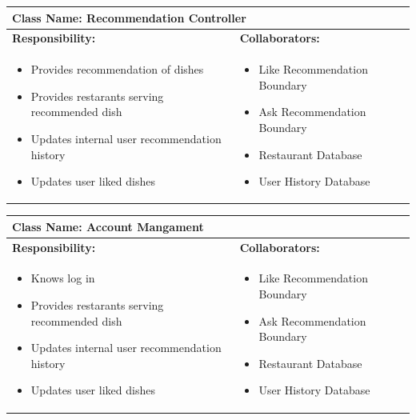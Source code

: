 \documentclass[]{article}
\begin{document}
\begin{table}[H]
	\centering
	\begin{tabular}{|p{7cm}|p{7cm}|}
	\hline 
	 \multicolumn{2}{|l|}{\textbf{Class Name:} Recommendation Controller} \\
	\hline
	\textbf{Responsibility:} & \textbf{Collaborators:} \\
	\hline
	\raggedright
	\begin{itemize}
		\item Provides recommendation of dishes
		\item  Provides restarants serving recommended dish
		\item Updates internal user recommendation history
		\item Updates user liked dishes
	\end{itemize}
	\vspace{1in} & 
	\begin{itemize}
		\item Like Recommendation Boundary
		\item Ask Recommendation Boundary
		\item Restaurant Database
		\item User History Database
	\end{itemize} \\
	\hline
	\end{tabular}
\end{table}

\begin{table}[H]
	\centering
	\begin{tabular}{|p{7cm}|p{7cm}|}
	\hline 
	 \multicolumn{2}{|l|}{\textbf{Class Name:} Account Mangament} \\
	\hline
	\textbf{Responsibility:} & \textbf{Collaborators:} \\
	\hline
	\raggedright
	\begin{itemize}
		\item Knows log in
		\item  Provides restarants serving recommended dish
		\item Updates internal user recommendation history
		\item Updates user liked dishes
	\end{itemize}
	\vspace{1in} & 
	\begin{itemize}
		\item Like Recommendation Boundary
		\item Ask Recommendation Boundary
		\item Restaurant Database
		\item User History Database
	\end{itemize} \\
	\hline
	\end{tabular}
\end{table}
\end{document}
